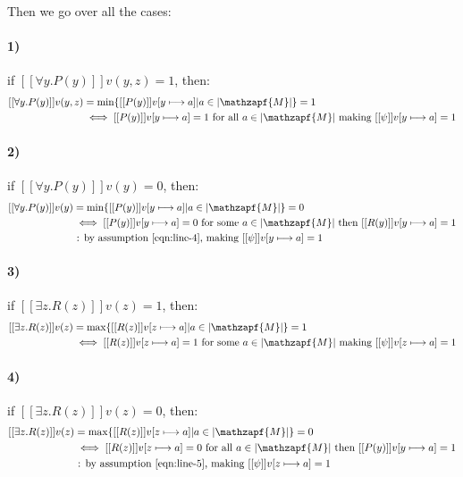 \documentclass{article}
\begin{document}
Then we go over all the cases:
\paragraph{1)}
if $ [[\forall y.P(y)]]v(y,z) = 1 $, then:
\begin{equation*}
\begin{split} 
  [[\forall y.P(y)]]v(y,z) &= \min\{[[P(y)]]v[y \longmapsto a] | a \in |\mathzapf{M}| \} = 1 \\
  &\iff [[P(y)]]v[y \longmapsto a] = 1 \text{ for all } a \in |\mathzapf{M}| \text{ making } [[\psi]]v[y \longmapsto a] = 1\\
\end{split}
\end{equation*}

\paragraph{2)}
if $ [[\forall y.P(y)]]v(y) = 0 $, then:
\begin{equation*}
\begin{split} 
  [[\forall y.P(y)]]v(y) &= \min\{[[P(y)]]v[y \longmapsto a] | a \in |\mathzapf{M}| \} = 0 \\
  &\iff [[P(y)]]v[y \longmapsto a] = 0 \text{ for some } a \in |\mathzapf{M}| \text { then } [[R(y)]]v[y \longmapsto a] = 1 \\ & \text{ : by assumption \ref{eqn:line-4}, making } [[\psi]]v[y \longmapsto a] = 1
\end{split}
\end{equation*}


\paragraph{3)}
if $ [[\exists z.R(z)]]v(z) = 1 $, then:
\begin{equation*}
\begin{split} 
  [[\exists z.R(z)]]v(z) &= \max\{[[R(z)]]v[z \longmapsto a ] | a \in |\mathzapf{M}| \} = 1 \\
  &\iff [[R(z)]]v[z \longmapsto a] = 1 \text{ for some } a \in |\mathzapf{M}| \text{ making } [[\psi]]v[z \longmapsto a] = 1\\
\end{split}
\end{equation*}

\paragraph{4)}
if $ [[\exists z.R(z)]]v(z) = 0 $, then:
\begin{equation*}
\begin{split} 
  [[\exists z.R(z)]]v(z) &= \max\{[[R(z)]]v[z \longmapsto a ] | a \in |\mathzapf{M}| \} = 0 \\
  &\iff [[R(z)]]v[z \longmapsto a] = 0 \text{ for all } a \in |\mathzapf{M}| \text { then } [[P(y)]]v[y \longmapsto a] = 1 \\ &\text{ : by assumption \ref{eqn:line-5}, making } [[\psi]]v[z \longmapsto a] = 1 \\
\end{split}
\end{equation*}
\end{document}
